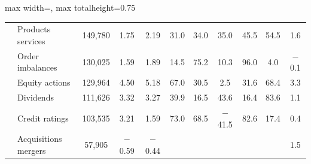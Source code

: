 \begin{table}[htbp]
{\begin{adjustbox}{max width=\linewidth, max totalheight=0.75\textheight}
\begin{tabular}{llccccccccc}
 & Products services & \phantom{,0}149,780 & \phantom{$-$}1.75 & \phantom{$-$}2.19 & \phantom{0}31.0 & \phantom{$-$}34.0 & \phantom{$-$}35.0 & \phantom{$-$}45.5 & \phantom{0}54.5 & \phantom{$-$}1.6 \\
 & Order imbalances & \phantom{,0}130,025 & \phantom{$-$}1.59 & \phantom{$-$}1.89 & \phantom{0}14.5 & \phantom{$-$}75.2 & \phantom{$-$}10.3 & \phantom{$-$}96.0 & \phantom{00}4.0 & $-$0.1 \\
 & Equity actions & \phantom{,0}129,964 & \phantom{$-$}4.50 & \phantom{$-$}5.18 & \phantom{0}67.0 & \phantom{$-$}30.5 & \phantom{$-$0}2.5 & \phantom{$-$}31.6 & \phantom{0}68.4 & \phantom{$-$}3.3 \\
 & Dividends & \phantom{,0}111,626 & \phantom{$-$}3.32 & \phantom{$-$}3.27 & \phantom{0}39.9 & \phantom{$-$}16.5 & \phantom{$-$}43.6 & \phantom{$-$}16.4 & \phantom{0}83.6 & \phantom{$-$}1.1 \\
 & Credit ratings & \phantom{,0}103,535 & \phantom{$-$}3.21 & \phantom{$-$}1.59 & \phantom{0}73.0 & \phantom{$-$}68.5 & $-$41.5 & \phantom{$-$}82.6 & \phantom{0}17.4 & \phantom{$-$}0.4 \\
 & Acquisitions mergers & \phantom{,00}57,905 & $-$0.59 & $-$0.44 &  &  &  &  &  & \phantom{$-$}1.5 \\
\bottomrule
\end{tabular}
\end{adjustbox}
}
\end{table}
